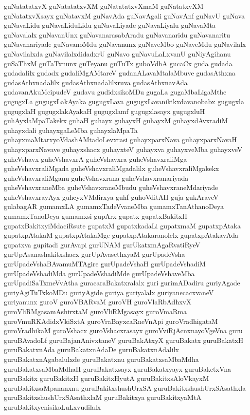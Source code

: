 {guNatatatxvX
guNatatatxvXM
guNatatatxvXmaM
guNatatxvXM
guNatatxvXsayx
guNatavxM
guNavAda
guNavAgali
guNavAnf
guNavU
guNava
guNavaLidu
guNavaLiduLidu
guNavaLiyade
guNavaLiyalu
guNavaMta
guNavalalx
guNavanUnx
guNavanarasabAradu
guNavanaridu
guNavanaritu
guNavanariyade
guNavanoMdu
guNavanunx
guNaveMbo
guNaveMdu
guNavilalx
guNavilalxda
guNavilalxdidadxrU
guNavo
guNavuLaLxvanU
guNiyAgihanu
guSaThxM
guTaTxnunx
guTeyanu
guTuTx
guboVdhA
gucaCx
guda
gudada
gudadalilx
gudadx
gudaliMgAMtareV
gudanALavaMtalaMbuve
gudasAthxna
gudasAthxnadalilx
gudasAthxnadalilxruva
gudasAthxnavAda
gudavanAkuMcipudeV
gudavu
gudidxsikoMDu
gugaLa
gugaMbaLigaMthe
gugugxLa
gugugxLakAyaka
gugugxLava
gugugxLavanikikxdavanobabx
gugugxla
gugugxlaH
gugugxlakAyakaH
gugugxlamf
gugugxlasayx
gugugxluH
guhAyxlaMpaTakekx
guhaH
guhayx
guhayxH
guhayxM
guhayxdAvxradiM
guhayxdali
guhayxgaLeMba
guhayxlaMpaTa
guhayxmaMtarxyoVdashAMtadoLevxrasi
guhayxparxNava
guhayxparxNavaH
guhayxparxNavave
guhayxshacx
guhayxteV
guhayxva
guhayxveMba
guhayxveV
guheVshavx
guheVshavxrA
guheVshavxra
guheVshavxraliMga
guheVshavxraliMgada
guheVshavxraliMgadalilx
guheVshavxraliMgakekx
guheVshavxraliMganu
guheVshavxrana
guheVshavxranariyada
guheVshavxraneMba
guheVshavxraneMbudu
guheVshavxraneMdariyade
guheVshavxrayAyx
guheyxVMdirxya
guhf
guhoVditAH
guja
gukAraveV
gulabagAR
gumamxLA
gumamxTadeVvaneMba
gumamxTanAthanoDeya
gumamxTanoDeya
gumamxsi
gupArx
gupatx
gupatxBakitxH
gupatxBakitxyiMdaciRsute
gupatxM
gupatxkadaLi
gupatxmaM
gupatxpAtaka
gupatxpAtakaM
gupatxpAtakaMge
gupatxpAtakaranolelx
gupatxpAtakavAda
gupatxva
gupitadi
gurAvapi
gurUNAM
gurUkatxmAgaRvatiRyeV
gurUpAsanashakitxshacx
gurUpAvasethxyaM
gurUpadeVsha
gurUpadeVshaBAvamuMTAgire
gurUpadeVshaH
gurUpadeVshadiM
gurUpadeVshadiMda
gurUpadeVshadiMde
gurUpadeVshaveMba
gurUpadiSaTxmeVvAtha
guracaraBakatxralalx
guri
gurimADadiru
guriyAgade
guriyAgiTuTxkoMDu
guriyAgide
guriya
guriyalalx
guriyanecacxvaneV
guriyanunx
guroV
guroVBARvaM
guroVH
guroVlaRbAdhxvX
guroVliRMgasamAshirxtaM
guroVliRMgasayx
guroVmaRma
guroVmuRKAdidxVkiSxtA
guroVraBayxcaRneVnApi
guroVradhigataM
guroVradhikaM
guroVshacx
guroVshacxrasayx
guroVviRjAcnxnayoVgeVna
guru
guruBAvadoLf
guruBajanAnivxtaneV
guruBakAtxyX
guruBakatx
guruBakatxH
guruBakatxnAda
guruBakatxnAdaDe
guruBakatxnAdalilx
guruBakatxnAgabalulxde
guruBakatxnu
guruBakatxsaMbaMdha
guruBakatxsaMbaMdhaH
guruBakatxsayx
guruBakatxyayx
guruBaketxVna
guruBakitx
guruBakitxH
guruBakitxHyutA
guruBakitxsAloVkayxM
guruBakitxsaMpananxnu
guruBakitxshushUrxSA
guruBakitxshushUrxSAsathxla
guruBakitxshushUrxSAsathxlaM
guruBakitxya
guruBakitxyaMtA
guruBakitxyenisikoLuLxvudilalx
}
